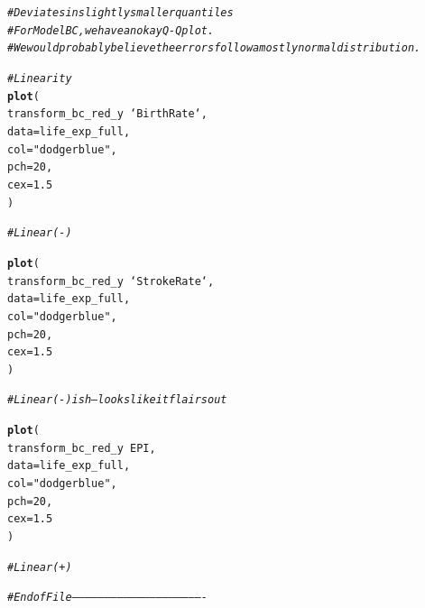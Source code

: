 \documentclass{article}\usepackage[]{graphicx}\usepackage[]{color}
\makeatletter
\newcommand{\hlnum}[1]{\textcolor[rgb]{0.686,0.059,0.569}{#1}}%
\newcommand{\hlstr}[1]{\textcolor[rgb]{0.192,0.494,0.8}{#1}}%
\newcommand{\hlcom}[1]{\textcolor[rgb]{0.678,0.584,0.686}{\textit{#1}}}%
\newcommand{\hlopt}[1]{\textcolor[rgb]{0,0,0}{#1}}%
\newcommand{\hlstd}[1]{\textcolor[rgb]{0.345,0.345,0.345}{#1}}%
\newcommand{\hlkwc}[1]{\textcolor[rgb]{0.333,0.667,0.333}{#1}}%
\newcommand{\hlkwd}[1]{\textcolor[rgb]{0.737,0.353,0.396}{\textbf{#1}}}%
\newenvironment{kframe}{%
 \def\at@end@of@kframe{}%
 \ifinner\ifhmode%
  \def\at@end@of@kframe{\end{minipage}}%
  \begin{minipage}{\columnwidth}%
 \fi\fi%
 \def\FrameCommand##1{\hskip\@totalleftmargin \hskip-\fboxsep
 \colorbox{shadecolor}{##1}\hskip-\fboxsep
     \hskip-\linewidth \hskip-\@totalleftmargin \hskip\columnwidth}%
 \MakeFramed {\advance\hsize-\width
   \@totalleftmargin\z@ \linewidth\hsize
   \@setminipage}}%
 {\par\unskip\endMakeFramed%
 \at@end@of@kframe}
\newenvironment{knitrout}{}{} %
\makeatother
\begin{document}
\begin{knitrout}
\begin{kframe}
{\ttfamily\noindent\bfseries\color{errorcolor}{\#\# Error in resid(model\_bc\_red\_transform): object 'model\_bc\_red\_transform' not found}}\begin{alltt}
\hlcom{# Deviates in slightly smaller quantiles}
\hlcom{# For Model BC, we have an okay Q-Q plot. }
\hlcom{# We would probably believe the errors follow a mostly normal distribution.}

\hlcom{# Linearity }
\hlkwd{plot}\hlstd{(}
  \hlstd{transform_bc_red_y} \hlopt{~} \hlstd{`Birth Rate`,}
  \hlkwc{data} \hlstd{= life_exp_full,}
  \hlkwc{col} \hlstd{=} \hlstr{"dodgerblue"}\hlstd{,}
  \hlkwc{pch} \hlstd{=} \hlnum{20}\hlstd{,}
  \hlkwc{cex} \hlstd{=} \hlnum{1.5}
\hlstd{)}
\end{alltt}


{\ttfamily\noindent\bfseries\color{errorcolor}{\#\# Error in eval(predvars, data, env): object 'transform\_bc\_red\_y' not found}}\begin{alltt}
\hlcom{# Linear (-)}

\hlkwd{plot}\hlstd{(}
  \hlstd{transform_bc_red_y} \hlopt{~} \hlstd{`Stroke Rate`,}
  \hlkwc{data} \hlstd{= life_exp_full,}
  \hlkwc{col} \hlstd{=} \hlstr{"dodgerblue"}\hlstd{,}
  \hlkwc{pch} \hlstd{=} \hlnum{20}\hlstd{,}
  \hlkwc{cex} \hlstd{=} \hlnum{1.5}
\hlstd{)}
\end{alltt}


{\ttfamily\noindent\bfseries\color{errorcolor}{\#\# Error in eval(predvars, data, env): object 'transform\_bc\_red\_y' not found}}\begin{alltt}
\hlcom{# Linear (-) ish --- looks like it flairs out}

\hlkwd{plot}\hlstd{(}
  \hlstd{transform_bc_red_y} \hlopt{~} \hlstd{EPI,}
  \hlkwc{data} \hlstd{= life_exp_full,}
  \hlkwc{col} \hlstd{=} \hlstr{"dodgerblue"}\hlstd{,}
  \hlkwc{pch} \hlstd{=} \hlnum{20}\hlstd{,}
  \hlkwc{cex} \hlstd{=} \hlnum{1.5}
\hlstd{)}
\end{alltt}


{\ttfamily\noindent\bfseries\color{errorcolor}{\#\# Error in eval(predvars, data, env): object 'transform\_bc\_red\_y' not found}}\begin{alltt}
\hlcom{# Linear (+)}




\hlcom{# End of File -------------------------------------------------------------}
\end{alltt}
\end{kframe}
\end{knitrout}
\end{document}
